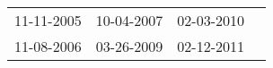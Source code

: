 \begin{supertabular}{llll}
 11-11-2005 &  10-04-2007 &  02-03-2010 \\
 11-08-2006 &  03-26-2009 &  02-12-2011 \\
\end{supertabular}
